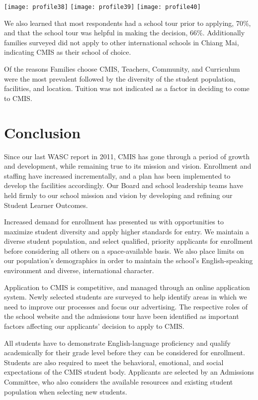 \texttt{[image: profile38]}
\texttt{[image: profile39]}
\texttt{[image: profile40]}

We also learned that most respondents had a school tour prior to applying, 70\%, and that the school tour was helpful in making the decision, 66\%. Additionally families surveyed did not apply to other international schools in Chiang Mai, indicating CMIS as their school of choice.

Of the reasons Families choose CMIS, Teachers, Community, and Curriculum were the most prevalent followed by the diversity of the student population, facilities, and location. Tuition was not indicated as a factor in deciding to come to CMIS.

\section{Conclusion}

Since our last WASC report in 2011, CMIS has gone through a period of growth and development, while remaining true to its mission and vision. Enrollment and staffing have increased incrementally, and a plan has been implemented to develop the facilities accordingly. Our Board and school leadership teams have held firmly to our school mission and vision by developing and refining our Student Learner Outcomes. 

Increased demand for enrollment has presented us with opportunities to maximize student diversity and apply higher standards for entry. We maintain a diverse student population, and select qualified, priority applicants for enrollment before considering all others on a space-available basis. We also place limits on our population's demographics in order to maintain the school's English-speaking environment and diverse, international character. 
 
Application to CMIS is competitive, and managed through an online application system. Newly selected students are surveyed to help identify areas in which we need to improve our processes and focus our advertising. The respective roles of the school website and the admissions tour have been identified as important factors affecting our applicants' decision to apply to CMIS. 

All students have to demonstrate English-language proficiency and qualify academically for their grade level before they can be considered for enrollment. Students are also required to meet the behavioral, emotional, and social expectations of the CMIS student body. Applicants are selected by an Admissions Committee, who also considers the available resources and existing student population when selecting new students.  

